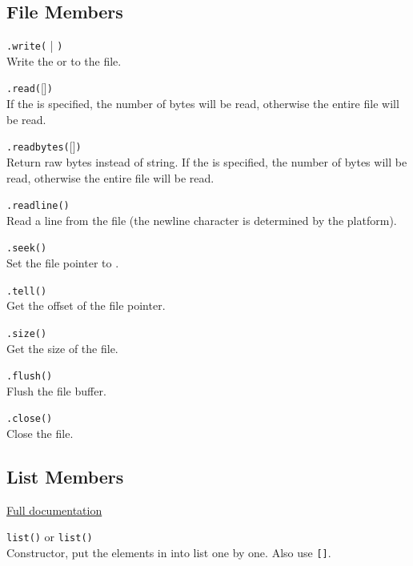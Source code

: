 \subsection*{File Members}

\hangpar {}\texttt{.write(} | \texttt{)}\\
Write the  or  to the file.

\hangpar {}\texttt{.read(}[]\texttt{)}\\
If the  is specified, the number of bytes will be read, otherwise the entire file will be read.

\hangpar {}\texttt{.readbytes(}[]\texttt{)}\\
Return raw bytes instead of string. If the  is specified, the number of bytes will be read, otherwise the entire file will be read.

\hangpar {}\texttt{.readline()}\\
Read a line from the file (the newline character is determined by the platform).

\hangpar {}\texttt{.seek(}\texttt{)}\\
Set the file pointer to .

\hangpar {}\texttt{.tell()}\\
Get the offset of the file pointer.

\hangpar {}\texttt{.size()}\\
Get the size of the file.

\hangpar {}\texttt{.flush()}\\
Flush the file buffer.

\hangpar {}\texttt{.close()}\\
Close the file.

\subsection*{List Members}

\hangpar \href{https://berry.readthedocs.io/en/latest/source/en/Chapter-7.html\#list-class}{Full documentation}

\hangpar \texttt{list()} or \texttt{list(}\texttt{)}\\
Constructor, put the elements in  into list one by one. Also use \texttt{[]}.


